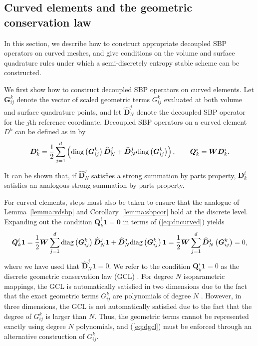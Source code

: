 \documentclass{svjour3}                     %
\renewcommand{\hat}{\widehat}
\newcommand{\diag}[1]{{\rm diag}\LRp{#1}}
\newcommand{\LRp}[1]{\left( #1 \right)}
\begin{document}
\subsection{Curved elements and the geometric conservation law}
\label{sec:curved}

In this section, we describe how to construct appropriate decoupled SBP operators on curved meshes, and give conditions on the volume and surface quadrature rules under which a semi-discretely entropy stable scheme can be constructed.


We first show how to construct decoupled SBP operators on curved elements.  Let $\bm{G}^k_{ij}$ denote the vector of scaled geometric terms ${G}^k_{ij}$ evaluated at both volume and surface quadrature points, and let $\hat{\bm{D}}^j_N$ denote the decoupled SBP operator for the $j$th reference coordinate.  Decoupled SBP operators on a curved element $D^k$ can be defined as in \cite{chan2018discretely} by
\begin{equation}
\bm{D}^i_k = \frac{1}{2}\sum_{j=1}^d \LRp{\diag{\bm{G}^k_{ij}}\hat{\bm{D}}^j_N + \hat{\bm{D}}^j_N\diag{\bm{G}^k_{ij}}}, \qquad \bm{Q}^i_k = \bm{W} \bm{D}^i_k.
\label{eq:dncurved}
\end{equation}
It can be shown that, if $\hat{\bm{D}}^j_N$ satisfies a strong summation by parts property, $\bm{D}^i_k$ satisfies an analogous strong summation by parts property.

For curved elements, steps must also be taken to ensure that the analogue of Lemma~\ref{lemma:vdsbp} and Corollary~\ref{lemma:sbpcor} hold at the discrete level.  Expanding out the condition $\bm{Q}^i_k\bm{1} = \bm{0}$ in terms of (\ref{eq:dncurved}) yields
\begin{align}
\bm{Q}^i_k \bm{1} = \frac{1}{2} \bm{W}\sum_{j=1}^d \diag{\bm{G}^k_{ij}}\hat{\bm{D}}^j_N \bm{1} + \hat{\bm{D}}^j_N\diag{\bm{G}^k_{ij}}\bm{1} = \frac{1}{2}\bm{W}\sum_{j=1}^d \hat{\bm{D}}^j_N\LRp{\bm{G}^k_{ij}} = 0,
\label{eq:dgcl}
\end{align}
where we have used that $\hat{\bm{D}}^j_N \bm{1} = 0$.  We refer to the condition $\bm{Q}^i_k\bm{1} = 0$ as the discrete geometric conservation law (GCL) \cite{thomas1979geometric, kopriva2006metric}.  For degree $N$ isoparametric mappings, the GCL is automatically satisfied in two dimensions due to the fact that the exact geometric terms ${G}^k_{ij}$ are polynomials of degree $N$ \cite{kopriva2006metric}.  However, in three dimensions, the GCL is not automatically satisfied due to the fact that the degree of $G^k_{ij}$ is larger than $N$.  Thus, the geometric terms cannot be represented exactly using degree $N$ polynomials, and (\ref{eq:dgcl}) must be enforced through an alternative construction of ${G}^k_{ij}$.  
\end{document}
